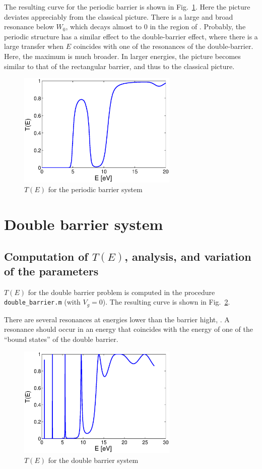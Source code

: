 \documentclass[12pt, a4paper]{article}
\begin{document}
The resulting curve for the periodic barrier is shown in Fig.~\ref{fig:periodicb}. Here the picture deviates appreciably from the classical picture. There is a large and broad resonance below $W_0$, which decays almost to $0$ in the region of . Probably, the periodic structure has a similar effect to the double-barrier effect, where there is a large transfer when $E$ coincides with one of the resonances of the double-barrier. Here, the maximum is much broader. In larger energies, the picture becomes similar to that of the rectangular barrier, and thus to the classical picture.

\begin{figure}[htb]
	\centering\includegraphics[width=3in]{periodic_barrier}
	\caption{$T(E)$ for the periodic barrier system}\label{fig:periodicb}
\end{figure}

\section{Double barrier system}
\subsection{Computation of $T(E)$, analysis, and variation of the parameters}
$T(E)$ for the double barrier problem is computed in the procedure \texttt{double\_barrier.m} (with $V_g=0$). The resulting curve is shown in Fig.~\ref{fig:doubleb}.

There are several resonances at energies lower than the barrier hight, . A resonance should occur in an energy that coincides with the energy of one of the ``bound states'' of the double barrier.

\begin{figure}[htb]
	\centering\includegraphics[width=3in]{double_barrier}
	\caption{$T(E)$ for the double barrier system}\label{fig:doubleb}
\end{figure}
\end{document}
